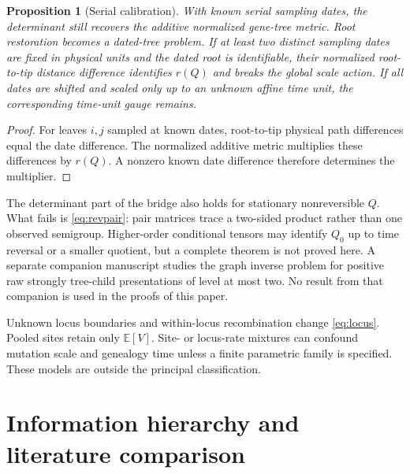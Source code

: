 \documentclass[11pt]{article}
\newtheorem{proposition}[theorem]{Proposition}
\begin{document}
\begin{proposition}[Serial calibration]
With known serial sampling dates, the determinant still recovers the additive normalized gene-tree metric.  Root restoration becomes a dated-tree problem.  If at least two distinct sampling dates are fixed in physical units and the dated root is identifiable, their normalized root-to-tip distance difference identifies $r(Q)$ and breaks the global scale action.  If all dates are shifted and scaled only up to an unknown affine time unit, the corresponding time-unit gauge remains.
\end{proposition}

\begin{proof}
For leaves $i,j$ sampled at known dates, root-to-tip physical path differences equal the date difference.  The normalized additive metric multiplies these differences by $r(Q)$.  A nonzero known date difference therefore determines the multiplier.
\end{proof}

The determinant part of the bridge also holds for stationary nonreversible $Q$.  What fails is \eqref{eq:revpair}: pair matrices trace a two-sided product rather than one observed semigroup.  Higher-order conditional tensors may identify $Q_0$ up to time reversal or a smaller quotient, but a complete theorem is not proved here.  A separate companion manuscript \citep{KriebelNMSCLevel2Companion2026} studies the graph inverse problem for positive raw strongly tree-child presentations of level at most two.  No result from that companion is used in the proofs of this paper.

Unknown locus boundaries and within-locus recombination change \eqref{eq:locus}.  Pooled sites retain only $\mathbb E[V]$.  Site- or locus-rate mixtures can confound mutation scale and genealogy time unless a finite parametric family is specified.  These models are outside the principal classification.

\section{Information hierarchy and literature comparison}
\end{document}
